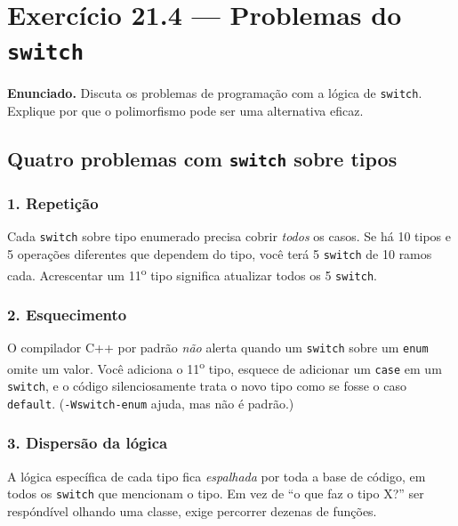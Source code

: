 \documentclass[11pt,a4paper]{article}
\begin{document}
\section{Exerc\'icio 21.4 --- Problemas do \texttt{switch}}

\begin{enunciado}
\textbf{Enunciado.} Discuta os problemas de programa\c{c}\~ao com a l\'ogica de \texttt{switch}. Explique por que o polimorfismo pode ser uma alternativa eficaz.
\end{enunciado}

\subsection*{Quatro problemas com \texttt{switch} sobre tipos}

\subsubsection*{1. Repeti\c{c}\~ao}

Cada \texttt{switch} sobre tipo enumerado precisa cobrir \emph{todos} os casos. Se h\'a 10 tipos e 5 opera\c{c}\~oes diferentes que dependem do tipo, voc\^e ter\'a 5 \texttt{switch} de 10 ramos cada. Acrescentar um 11\textsuperscript{o} tipo significa atualizar todos os 5 \texttt{switch}.

\subsubsection*{2. Esquecimento}

O compilador C++ por padr\~ao \emph{n\~ao} alerta quando um \texttt{switch} sobre um \texttt{enum} omite um valor. Voc\^e adiciona o 11\textsuperscript{o} tipo, esquece de adicionar um \texttt{case} em um \texttt{switch}, e o c\'odigo silenciosamente trata o novo tipo como se fosse o caso \texttt{default}. (\texttt{-Wswitch-enum} ajuda, mas n\~ao \'e padr\~ao.)

\subsubsection*{3. Dispers\~ao da l\'ogica}

A l\'ogica espec\'ifica de cada tipo fica \emph{espalhada} por toda a base de c\'odigo, em todos os \texttt{switch} que mencionam o tipo. Em vez de ``o que faz o tipo X?'' ser resp\'ond\'ivel olhando uma classe, exige percorrer dezenas de fun\c{c}\~oes.
\end{document}
